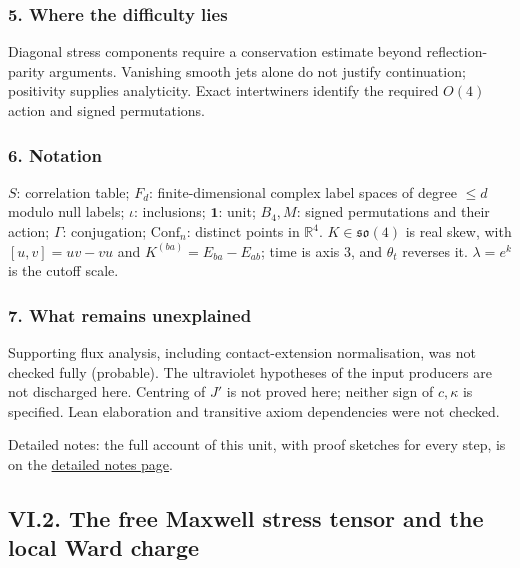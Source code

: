 \documentclass[
  letterpaper,
  11pt]{article}
\begin{document}
\subsubsection{5. Where the difficulty
lies}\label{where-the-difficulty-lies-23}

Diagonal stress components require a conservation estimate beyond
reflection-parity arguments. Vanishing smooth jets alone do not justify
continuation; positivity supplies analyticity. Exact intertwiners
identify the required \(O(4)\) action and signed permutations.

\subsubsection{6. Notation}\label{notation-23}

\(S\): correlation table; \(F_d\): finite-dimensional complex label
spaces of degree \(\le d\) modulo null labels; \(\iota\): inclusions;
\(\mathbf1\): unit; \(B_4,M\): signed permutations and their action;
\(\Gamma\): conjugation; \(\mathrm{Conf}_n\): distinct points in
\(\mathbb R^4\). \(K\in\mathfrak{so}(4)\) is real skew, with
\([u,v]=uv-vu\) and \(K^{(ba)}=E_{ba}-E_{ab}\); time is axis \(3\), and
\(\theta_t\) reverses it. \(\lambda=e^k\) is the cutoff scale.

\subsubsection{7. What remains
unexplained}\label{what-remains-unexplained-23}

Supporting flux analysis, including contact-extension normalisation, was
not checked fully (probable). The ultraviolet hypotheses of the input
producers are not discharged here. Centring of \(J'\) is not proved
here; neither sign of \(c,\kappa\) is specified. Lean elaboration and
transitive axiom dependencies were not checked.

Detailed notes: the full account of this unit, with proof sketches for
every step, is on the
\href{https://github.com/scottnarmstrong/yang-mills-informalization/blob/main/outline/notes/VI-1.md}{detailed
notes page}.

\subsection{VI.2. The free Maxwell stress tensor and the local Ward
charge}\label{vi.2.-the-free-maxwell-stress-tensor-and-the-local-ward-charge}
\end{document}
